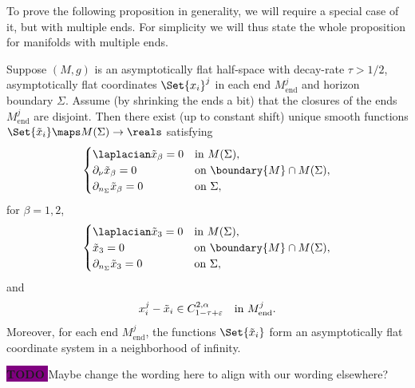 \documentclass[titlepage,numbers=noenddot,headinclude,oneside,%
footinclude=true,cleardoublepage=empty,%
BCOR=5mm,paper=a4,fontsize=11pt,%
english,%
]{scrartcl}
\newcommand{\Mend}{M_{\mathrm{end}}} %
\newcommand{\todomark}{%
    \colorbox{purple}{%
        \textnormal\ttfamily\bfseries\color{white}%
        TODO%
    }%
}
\newcommand{\todo}[1][]{%
    \ifstrempty{#1}{%
        \def\todotext{Todo}%
    }{%
        \def\todotext{Todo: #1}%
    }%
    \todomark%
    {%
        \marginpar{%
            \raggedright\normalfont\sffamily\scriptsize\todotext%
        }%
    }%
}
\begin{document}
To prove the following proposition in generality, we will require a special case of it, but with multiple ends. For simplicity we will thus state the whole proposition for manifolds with multiple ends.
\begin{proposition}\label{prop:existence_and_uniqueness}
    Suppose \( (M,g) \) is an asymptotically flat half-space with decay-rate \( \tau>1/2 \), asymptotically flat coordinates \( \Set{x_i}^j \) in each end \( \Mend^j \) and horizon boundary \( \Sigma \). Assume (\eg by shrinking the ends a bit) that the closures of the ends \( \Mend^j \) are disjoint. Then there exist (up to constant shift) unique smooth functions \( \Set{\tilde{x}_i}\maps M(\Sigma)\to \reals \) satisfying
    \begin{equation*}
        \begin{cases}
            \laplacian \tilde{x}_\beta=0& \text{in \( M(\Sigma) \)},\\
            \partial_\nu \tilde{x}_\beta=0& \text{on \( \boundary{M}\cap M(\Sigma) \)},\\
            \partial_{n_\Sigma}\tilde{x}_\beta=0&\text{on \( \Sigma \)},
        \end{cases}
    \end{equation*}
    for \( \beta=1,2 \),
    \begin{equation*}
        \begin{cases}
            \laplacian \tilde{x}_3=0& \text{in \( M(\Sigma) \)},\\
            \tilde{x}_3=0& \text{on \( \boundary{M}\cap M(\Sigma) \)},\\
            \partial_{n_{\Sigma}}\tilde{x}_3=0& \text{on \( \Sigma \)},
        \end{cases}
    \end{equation*}
    and
    \begin{equation*}
        x_i^j-\tilde{x}_i\in C_{1-\tau+\varepsilon}^{2,\alpha} \quad \text{in \( \Mend^j \)}.
    \end{equation*}
    Moreover, for each end \( \Mend^j \), the functions \( \Set{\tilde{x}_i} \) form an asymptotically flat coordinate system in a neighborhood of infinity.
    
    \todo{Maybe change the wording here to align with our wording elsewhere?}
\end{proposition} 
\end{document}
